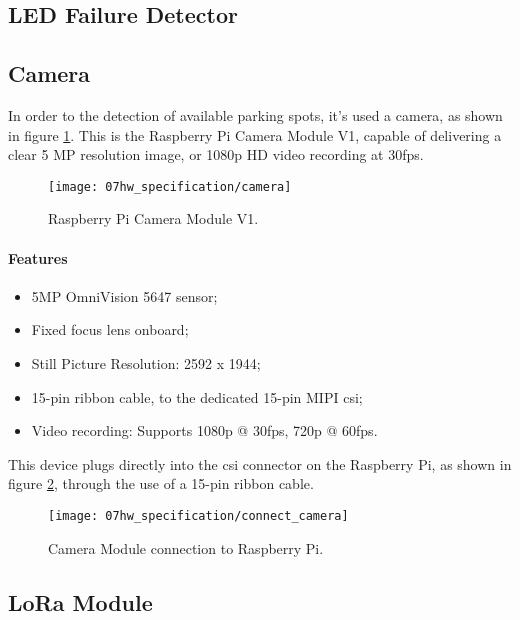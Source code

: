 \subsection{LED Failure Detector}

\subsection{Camera}
In order to the detection of available parking spots, it's used a camera, as shown in figure \ref{fig:camera}. This is the Raspberry Pi Camera Module V1, capable of delivering a clear 5 MP resolution image, or 1080p HD video recording at 30fps. \cite{camera}

\begin{figure}[H]
	\centering
	\texttt{[image: 07hw\_specification/camera]}
	\caption{Raspberry Pi Camera Module V1.}
	\label{fig:camera}
\end{figure}

\paragraph*{Features}
\begin{itemize}
	\item 5MP OmniVision 5647 sensor;
	\item Fixed focus lens onboard;
	\item Still Picture Resolution: 2592 x 1944;
	\item 15-pin ribbon cable, to the dedicated 15-pin MIPI \ac{csi};
	\item Video recording: Supports 1080p @ 30fps, 720p @ 60fps.
\end{itemize}

\clearpage
This device plugs directly into the \ac{csi} connector on the Raspberry Pi, as shown in figure \ref{fig:connect_camera}, through the use of a 15-pin ribbon cable.

\begin{figure}[ht]
	\centering
	\texttt{[image: 07hw\_specification/connect\_camera]}
	\caption{Camera Module connection to Raspberry Pi.}
	\label{fig:connect_camera}
\end{figure}
\subsection{LoRa Module}

